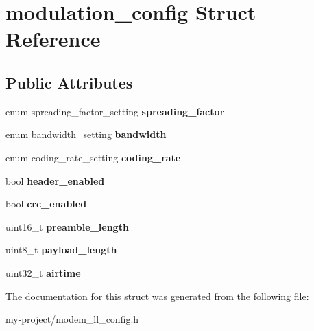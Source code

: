 \hypertarget{structmodulation__config}{}\section{modulation\+\_\+config Struct Reference}
\label{structmodulation__config}
\subsection*{Public Attributes}
\begin{DoxyCompactItemize}
\item 
\mbox{\label{structmodulation__config_ac486c5b940f9d4dca08721a471ec3204}} 
enum spreading\+\_\+factor\+\_\+setting {\bfseries spreading\+\_\+factor}
\item 
\mbox{\label{structmodulation__config_a3e760deabbed5cdd84e115d801018085}} 
enum bandwidth\+\_\+setting {\bfseries bandwidth}
\item 
\mbox{\label{structmodulation__config_aab4e1e55c000109ccc7129a198702f3e}} 
enum coding\+\_\+rate\+\_\+setting {\bfseries coding\+\_\+rate}
\item 
\mbox{\label{structmodulation__config_a198972bb158ece796d3c6c81448abaf3}} 
bool {\bfseries header\+\_\+enabled}
\item 
\mbox{\label{structmodulation__config_a8d414a4c5159fc27fb725f29378ea3ab}} 
bool {\bfseries crc\+\_\+enabled}
\item 
\mbox{\label{structmodulation__config_ae2f06111424842529480716bd95882e5}} 
uint16\+\_\+t {\bfseries preamble\+\_\+length}
\item 
\mbox{\label{structmodulation__config_a7c097eff76bbbb63ce75ad000c3447c4}} 
uint8\+\_\+t {\bfseries payload\+\_\+length}
\item 
\mbox{\label{structmodulation__config_aa8030df76f3cb2b1615a9da508548617}} 
uint32\+\_\+t {\bfseries airtime}
\end{DoxyCompactItemize}


The documentation for this struct was generated from the following file\+:\begin{DoxyCompactItemize}
\item 
my-\/project/modem\+\_\+ll\+\_\+config.\+h\end{DoxyCompactItemize}
